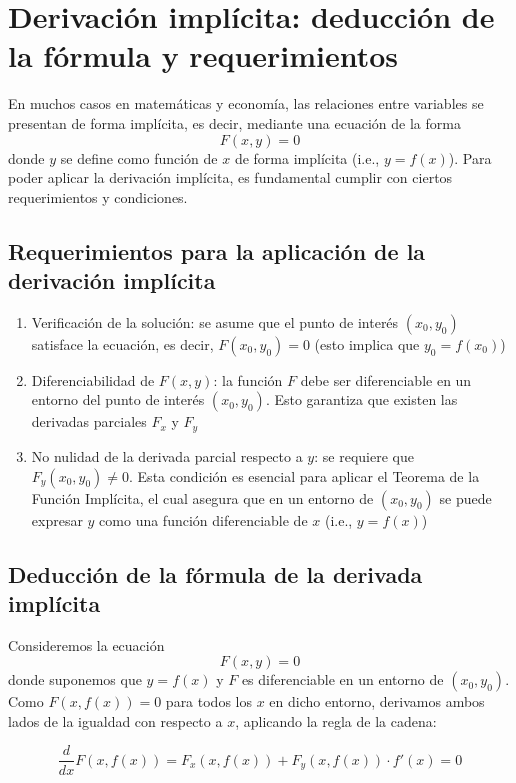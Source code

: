 \documentclass{article}
\begin{document}
\section*{Derivación implícita: deducción de la fórmula y requerimientos}

En muchos casos en matemáticas y economía, las relaciones entre variables se presentan de forma implícita, es decir, mediante una ecuación de la forma
\[
F(x,y) = 0
\]
donde \( y \) se define como función de \( x \) de forma implícita (i.e., \( y = f(x) \)). Para poder aplicar la derivación implícita, es fundamental cumplir con ciertos requerimientos y condiciones.

\subsection*{Requerimientos para la aplicación de la derivación implícita}
\begin{enumerate}
    \item {\color{teal}Verificación de la solución:} se asume que el punto de interés \((x_0,y_0)\) satisface la ecuación, es decir, \(F(x_0,y_0) = 0\) (esto implica que \(y_0 = f(x_0)\))
    \item {\color{teal}Diferenciabilidad de \( F(x,y) \):} la función \( F \) debe ser diferenciable en un entorno del punto de interés \((x_0,y_0)\). Esto garantiza que existen las derivadas parciales \( F_x \) y \( F_y \)
    \item {\color{teal}No nulidad de la derivada parcial respecto a \( y \):} se requiere que \( F_y(x_0,y_0) \neq 0 \). Esta condición es esencial para aplicar el Teorema de la Función Implícita, el cual asegura que en un entorno de \((x_0,y_0)\) se puede expresar \( y \) como una función diferenciable de \( x \) (i.e., \( y = f(x) \))
\end{enumerate}

\subsection*{Deducción de la fórmula de la derivada implícita}

Consideremos la ecuación
\[
F(x,y) = 0
\]
donde suponemos que \( y = f(x) \) y \( F \) es diferenciable en un entorno de \((x_0,y_0)\). Como \( F(x,f(x)) = 0 \) para todos los \( x \) en dicho entorno, derivamos ambos lados de la igualdad con respecto a \( x \), aplicando la regla de la cadena:

\[
\frac{d}{dx}F(x,f(x)) = F_x(x,f(x)) + F_y(x,f(x)) \cdot f'(x) = 0
\]
\end{document}
